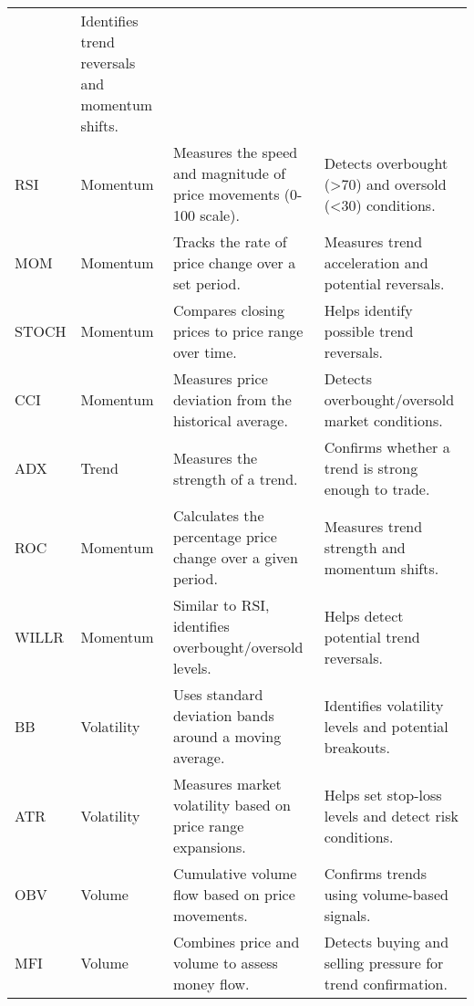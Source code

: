 \begin{longtable}{llp{5cm}p{5cm}}
        & Identifies trend reversals and momentum shifts. \\
        RSI 
        & Momentum 
        & Measures the speed and magnitude of price movements (0-100 scale). 
        & Detects overbought (>70) and oversold (<30) conditions. \\
        MOM & Momentum 
        & Tracks the rate of price change over a set period. 
        & Measures trend acceleration and potential reversals. \\
        STOCH & Momentum
        & Compares closing prices to price range over time. 
        & Helps identify possible trend reversals. \\
        CCI & Momentum 
        & Measures price deviation from the historical average. 
        & Detects overbought/oversold market conditions. \\
        ADX & Trend 
        & Measures the strength of a trend. 
        & Confirms whether a trend is strong enough to trade. \\
        ROC & Momentum 
        & Calculates the percentage price change over a given period. 
        & Measures trend strength and momentum shifts. \\
        WILLR & Momentum
        & Similar to RSI, identifies overbought/oversold levels. 
        & Helps detect potential trend reversals. \\
        BB & Volatility 
        & Uses standard deviation bands around a moving average. 
        & Identifies volatility levels and potential breakouts. \\
        ATR & Volatility 
        & Measures market volatility based on price range expansions. 
        & Helps set stop-loss levels and detect risk conditions. \\
        OBV & Volume 
        & Cumulative volume flow based on price movements. 
        & Confirms trends using volume-based signals. \\
        MFI & Volume
        & Combines price and volume to assess money flow. 
        & Detects buying and selling pressure for trend confirmation. \\
        \hline
\end{longtable}

